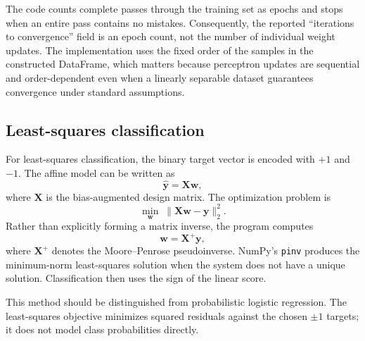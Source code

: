 \documentclass[11pt,a4paper]{article}
\newcommand{\code}[1]{\texttt{#1}}
\begin{document}
The code counts complete passes through the training set as epochs and stops when an entire pass contains no mistakes. Consequently, the reported ``iterations to convergence'' field is an epoch count, not the number of individual weight updates. The implementation uses the fixed order of the samples in the constructed DataFrame, which matters because perceptron updates are sequential and order-dependent even when a linearly separable dataset guarantees convergence under standard assumptions.

\subsection{Least-squares classification}
For least-squares classification, the binary target vector is encoded with \(+1\) and \(-1\). The affine model can be written as
\begin{equation}
\hat{\mathbf{y}}=\mathbf{X}\mathbf{w},
\end{equation}
where \(\mathbf{X}\) is the bias-augmented design matrix. The optimization problem is
\begin{equation}
\min_{\mathbf{w}}\;\lVert\mathbf{X}\mathbf{w}-\mathbf{y}\rVert_2^2.
\end{equation}
Rather than explicitly forming a matrix inverse, the program computes
\begin{equation}
\mathbf{w}=\mathbf{X}^{+}\mathbf{y},
\end{equation}
where \(\mathbf{X}^{+}\) denotes the Moore--Penrose pseudoinverse. NumPy's \code{pinv} produces the minimum-norm least-squares solution when the system does not have a unique solution. Classification then uses the sign of the linear score.

This method should be distinguished from probabilistic logistic regression. The least-squares objective minimizes squared residuals against the chosen \(\pm1\) targets; it does not model class probabilities directly.
\end{document}
